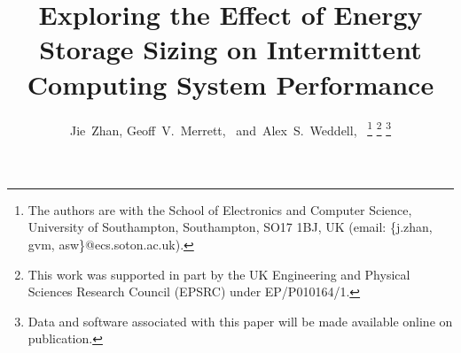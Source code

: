 \documentclass[journal, twoside]{IEEEtran}
\begin{document}
%

\title{Exploring the Effect of Energy Storage Sizing on Intermittent Computing System Performance}

%
%

\author{Jie~Zhan, %
        Geoff~V.~Merrett,~
        and~Alex~S.~Weddell,~%
\thanks{The authors are with the School of Electronics and Computer Science, University of Southampton, Southampton, SO17 1BJ, UK (email: \{j.zhan, gvm, asw\}@ecs.soton.ac.uk).}
\thanks{This work was supported in part by the UK Engineering and Physical Sciences Research Council (EPSRC) under EP/P010164/1. }
\thanks{Data and software associated with this paper will be made available online on publication. }}
% 
%
\end{document}
